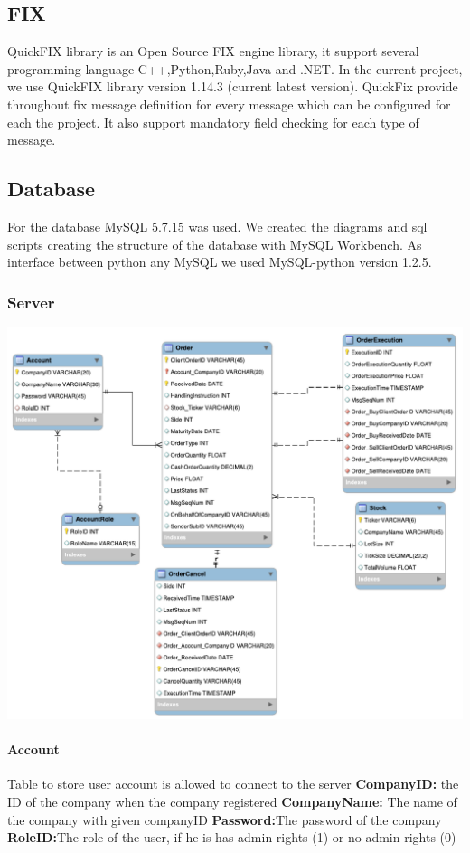 \documentclass[a4paper, 11pt]{article}
\begin{document}
\subsection*{FIX}
QuickFIX library is an Open Source FIX engine library, it support several programming language C++,Python,Ruby,Java and .NET. 
In the current project, we use QuickFIX library version 1.14.3 (current latest version). QuickFix provide throughout fix message definition for every message which can be configured for each the project.
It also support mandatory field checking for each type of message.
\subsection*{Database}

For the database MySQL 5.7.15 was used. We created the diagrams and sql scripts creating the structure of the database with MySQL Workbench.
As interface between python any MySQL we used MySQL-python version 1.2.5.
\subsubsection*{Server}
\includegraphics{../diagrams/server_database.pdf}

\paragraph*{Account}
Table to store user account is allowed to connect to the server
\textbf{CompanyID:} the ID of the company when the company registered
\textbf{CompanyName:} The name of the company with given companyID
\textbf{Password:}The password of the company
\textbf{RoleID:}The role of the user, if he is has admin rights (1) or no admin rights (0)
\end{document}

